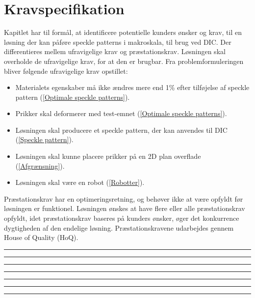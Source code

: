 \chapter{Kravspecifikation} \label{Kravspecifikation}

Kapitlet har til formål, at identificere potentielle kunders ønsker og krav, til en løsning der kan påføre speckle patterns i makroskala, til brug ved DIC. Der differentieres mellem ufravigelige krav og præstationskrav. Løsningen skal overholde de ufravigelige krav, for at den er brugbar. Fra problemformuleringen bliver følgende ufravigelige krav opstillet:
\begin{itemize}
    \item Materialets egenskaber må ikke ændres mere end 1\% efter tilføjelse af speckle pattern (\ref{Optimale speckle patterns}).
    \item Prikker skal deformerer med test-emnet (\ref{Optimale speckle patterns}).
    \item Løsningen skal producere et speckle pattern, der kan anvendes til DIC (\ref{Speckle pattern}).
    \item Løsningen skal kunne placere prikker på en 2D plan overflade (\ref{Afgrænsning}). 
    \item Løsningen skal være en robot (\ref{Robotter}).
\end{itemize}

Præstationskrav har en optimeringsretning, og behøver ikke at være opfyldt før løsningen er funktionel. Løsningen ønskes at have flere eller alle præstationskrav opfyldt, idet præstationskrav baseres på kunders ønsker, øger det konkurrence dygtigheden af den endelige løsning. Præstationskravene udarbejdes gennem House of Quality (HoQ).

\plainbreak{2}

\plainbreak{2}
 \plainbreak{2}

\plainbreak{2}

\plainbreak{2}

\plainbreak{2}

\plainbreak{2}


